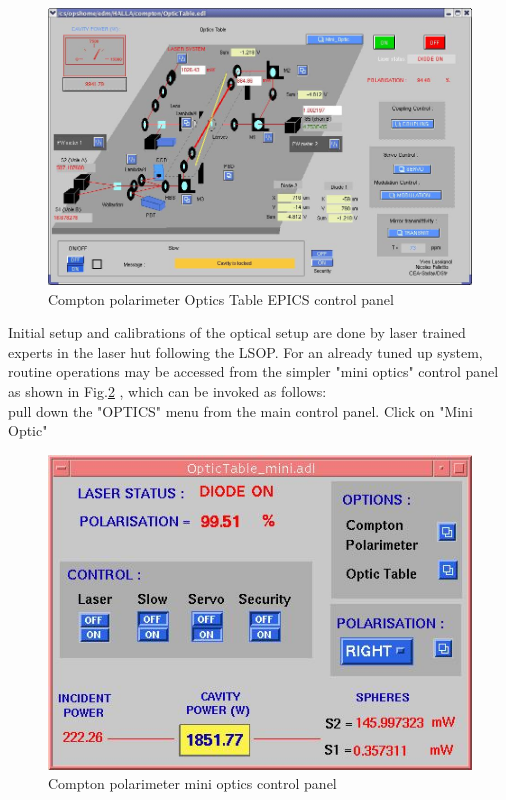  \begin{figure}[htp]
    \begin{center}
        \includegraphics*[angle=90,scale=.66]{compton_optics_table}
    \end{center}
    \caption[compton:epics main control]{Compton polarimeter Optics Table  EPICS control panel}
    \label{fig:compton_table}
 \end{figure}

Initial setup and calibrations of the optical setup are done by laser trained experts in the laser hut following the LSOP\cite{compton_LSOP}. For an already tuned up system, routine operations  may be accessed from the simpler "mini optics" control panel as shown in  Fig.\ref{fig:compton_optic_mini} , which can be invoked as follows: \\ 

\noindent pull down the "OPTICS" menu from the main control panel. Click on "Mini Optic" 

\begin{figure}[htp]
    \begin{center}
        \includegraphics*[angle=0,scale=0.8]{compton_optic_mini}
     \end{center}
    \caption[compton:epics mini control]{Compton polarimeter mini optics control panel }
    \label{fig:compton_optic_mini}
 \end{figure}

